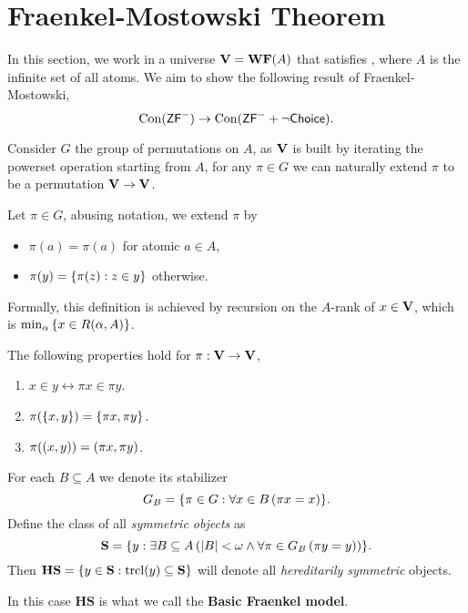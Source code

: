 \section{Fraenkel-Mostowski Theorem}

\newcommand{\Con}{\operatorname{Con}}
In this section, we work in a universe \(\mathbf{V} = \mathbf{WF}(A)\) that satisfies \ZFminus, where \(A\) is the infinite set of all atoms.
We aim to show the following result of Fraenkel-Mostowski,
\[\Con(\ZFminus) \to \Con(\ZFminus + \lnot\textsf{Choice}).\]

Consider \(G\) the group of permutations on \(A\),
as \(\mathbf{V}\) is built by iterating the powerset operation starting from \(A\),
for any \(\pi\in G\) we can naturally extend \(\pi\) to be a permutation \(\mathbf{V}\to\mathbf{V}\).
\begin{definition}
    Let \(\pi \in G\), abusing notation, we extend \(\pi\) by
    \begin{itemize}
        \item \(\pi(a) = \pi(a)\) for atomic \(a\in A\),
        \item \(\pi(y) = {\left\{ \pi(z): z\in y \right\}}\) otherwise.
    \end{itemize}
\end{definition}
\begin{remark}
    Formally, this definition is achieved by recursion on the \(A\)-rank of \(x\in\mathbf{V}\), which is \(\min_{\alpha} {\left\{ x\in R(\alpha,A) \right\}}\).
\end{remark}
\begin{observation}
    The following properties hold for \(\pi:\mathbf{V}\to\mathbf{V}\),
    \begin{enumerate}
        \item \(x\in y\leftrightarrow \pi x \in \pi y\).
        \item \(\pi({\left\{ x,y \right\}}) = {\left\{ \pi x, \pi y \right\}}\).
        \item \(\pi(\left(x,y\right)) = \left(\pi x, \pi y\right)\).
    \end{enumerate}
\end{observation}

\begin{definition}
    For each \(B\subseteq A\) we denote its stabilizer
    \[ G_B = {\left\{ \pi\in G: \forall x\in B\left(\pi x = x\right) \right\}}.\]
    Define the class of all \emph{symmetric objects} as
    \[ \mathbf{S} = {\left\{ y:\exists B\subseteq A\left(\left\lvert B \right\rvert<\omega \land \forall \pi\in G_B\left(\pi y = y\right)\right) \right\}}. \]
    Then \(\mathbf{HS} = {\left\{ y\in \mathbf{S}:\operatorname{trcl}(y)\subseteq \mathbf{S} \right\}}\) will denote all \emph{hereditarily symmetric} objects.
\end{definition}
\begin{remark}
    In this case \(\mathbf{HS}\) is what we call the \textbf{Basic Fraenkel model}.
\end{remark}

